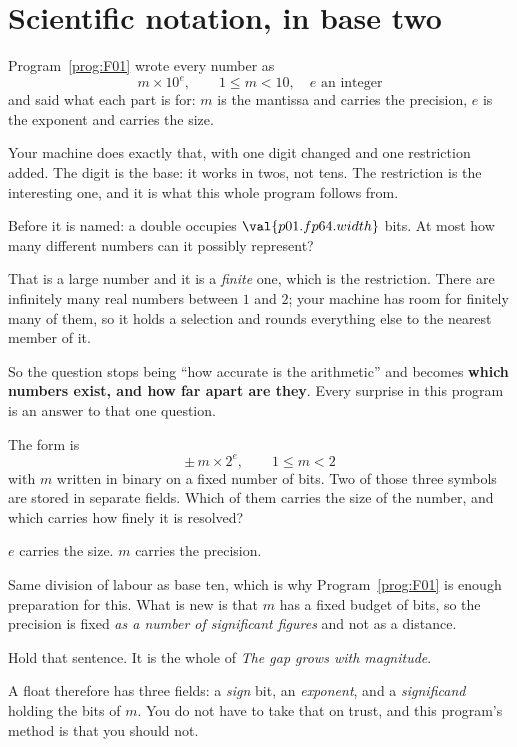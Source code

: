 \section{Scientific notation, in base two}
\label{sec:P01-form}

\begin{fr}
Program~\ref{prog:F01} wrote every number as
\[ m \times 10^{e}, \qquad 1 \le m < 10, \quad e \text{ an integer} \]
and said what each part is for: $m$ is the mantissa and carries the precision,
$e$ is the exponent and carries the size.

Your machine does exactly that, with one digit changed and one restriction
added. The digit is the base: it works in twos, not tens. The restriction is
the interesting one, and it is what this whole program follows from.

Before it is named: a double occupies $\val{p01.fp64.width}$ bits. At most how
many different numbers can it possibly represent?
\nextframe
\end{fr}

\begin{fr}
That is a large number and it is a \emph{finite} one, which is the restriction.
There are infinitely many real numbers between $1$ and $2$; your machine has
room for finitely many of them, so it holds a selection and rounds everything
else to the nearest member of it.

So the question stops being \enquote{how accurate is the arithmetic} and
becomes \textbf{which numbers exist, and how far apart are they}. Every
surprise in this program is an answer to that one question.

The form is
\[ \pm\, m \times 2^{e}, \qquad 1 \le m < 2 \]
with $m$ written in binary on a fixed number of bits. Two of those three
symbols are stored in separate fields. Which of them carries the size of the
number, and which carries how finely it is resolved?
\nextframe
\end{fr}

\begin{fr}
\begin{ansblock}
$e$ carries the size. $m$ carries the precision.
\end{ansblock}

Same division of labour as base ten, which is why Program~\ref{prog:F01} is
enough preparation for this. What is new is that $m$ has a fixed budget of
bits, so the precision is fixed \emph{as a number of significant figures} and
not as a distance.

Hold that sentence. It is the whole of \emph{The gap grows with magnitude}.

A float therefore has three fields: a \emph{sign} bit, an \emph{exponent}, and
a \emph{significand} holding the bits of $m$. You do not have to take that on
trust, and this program's method is that you should not.
\end{fr}

